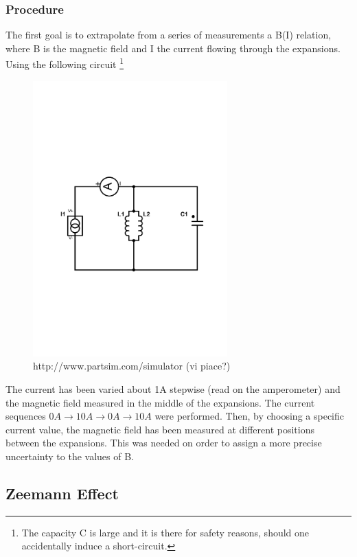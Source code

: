 \documentclass[a4paper,12pt,abstracton]{scrartcl}
\begin{document}
\subsubsection{Procedure}
The first goal is to extrapolate from a series of measurements a B(I) relation, where B is the magnetic field and I the current flowing through the expansions. 
Using the following circuit \footnote{The capacity C is large and it is there for safety reasons, should one accidentally induce a short-circuit.}
\begin{figure}[H]
\begin{center}
\includegraphics[trim=3cm 8cm 2.5cm 10cm,clip,width=7.5cm,keepaspectratio]{circuito1.pdf} 
\caption{http://www.partsim.com/simulator (vi piace?)}
\end{center} 
\end{figure}
The current has been varied about 1A stepwise (read on the amperometer) and the magnetic field measured in the middle of the expansions. The current sequences $0A \longrightarrow 10A \longrightarrow 0A \longrightarrow 10A$ were performed.
Then, by choosing a specific current value, the magnetic field has been measured at different positions between the expansions. This was needed on order to assign a more precise uncertainty to the values of B.
\subsection{Zeemann Effect}
\end{document}
